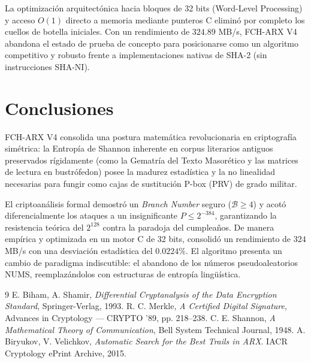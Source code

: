 \documentclass[10pt,twocolumn,letterpaper]{article}
\begin{document}
La optimización arquitectónica hacia bloques de 32 bits (Word-Level Processing) y acceso $O(1)$ directo a memoria mediante punteros C eliminó por completo los cuellos de botella iniciales. Con un rendimiento de $324.89$ MB/s, FCH-ARX V4 abandona el estado de prueba de concepto para posicionarse como un algoritmo competitivo y robusto frente a implementaciones nativas de SHA-2 (sin instrucciones SHA-NI).

\section{Conclusiones}
FCH-ARX V4 consolida una postura matemática revolucionaria en criptografía simétrica: la Entropía de Shannon inherente en corpus literarios antiguos preservados rígidamente (como la Gematría del Texto Masorético y las matrices de lectura en bustrófedon) posee la madurez estadística y la no linealidad necesarias para fungir como cajas de sustitución P-box (PRV) de grado militar.

El criptoanálisis formal demostró un \textit{Branch Number} seguro ($\mathcal{B} \ge 4$) y acotó diferencialmente los ataques a un insignificante $P \le 2^{-384}$, garantizando la resistencia teórica del $2^{128}$ contra la paradoja del cumpleaños. De manera empírica y optimizada en un motor C de 32 bits, consolidó un rendimiento de $324$ MB/s con una desviación estadística del $0.0224\%$. El algoritmo presenta un cambio de paradigma indiscutible: el abandono de los números pseudoaleatorios NUMS, reemplazándolos con estructuras de entropía lingüística.

\begin{thebibliography}{9}
E. Biham, A. Shamir, \textit{Differential Cryptanalysis of the Data Encryption Standard}, Springer-Verlag, 1993.
R. C. Merkle, \textit{A Certified Digital Signature}, Advances in Cryptology — CRYPTO '89, pp. 218–238.
C. E. Shannon, \textit{A Mathematical Theory of Communication}, Bell System Technical Journal, 1948.
A. Biryukov, V. Velichkov, \textit{Automatic Search for the Best Trails in ARX}. IACR Cryptology ePrint Archive, 2015.
\end{thebibliography}
\end{document}
